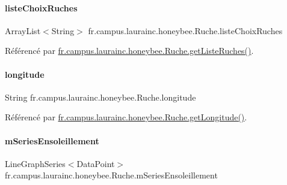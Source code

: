 \paragraph{\texorpdfstring{liste\+Choix\+Ruches}{listeChoixRuches}}
{\footnotesize\ttfamily Array\+List$<$String$>$ fr.\+campus.\+laurainc.\+honeybee.\+Ruche.\+liste\+Choix\+Ruches\hspace{0.3cm}{\ttfamily [private]}}



Référencé par \hyperlink{classfr_1_1campus_1_1laurainc_1_1honeybee_1_1_ruche_a7108fb412c0628d3966aa8c76fd9e2b7}{fr.\+campus.\+laurainc.\+honeybee.\+Ruche.\+get\+Liste\+Ruches()}.

\mbox{\label{classfr_1_1campus_1_1laurainc_1_1honeybee_1_1_ruche_a298a62f192d8f018fa5f4bd5b3d8c157}} 
\paragraph{\texorpdfstring{longitude}{longitude}}
{\footnotesize\ttfamily String fr.\+campus.\+laurainc.\+honeybee.\+Ruche.\+longitude\hspace{0.3cm}{\ttfamily [private]}}



Référencé par \hyperlink{classfr_1_1campus_1_1laurainc_1_1honeybee_1_1_ruche_a45b3656e287e168f17fdd1b9ec5fbca1}{fr.\+campus.\+laurainc.\+honeybee.\+Ruche.\+get\+Longitude()}.

\mbox{\label{classfr_1_1campus_1_1laurainc_1_1honeybee_1_1_ruche_a46b1a74ed27674490aff13504ce39b5a}} 
\paragraph{\texorpdfstring{m\+Series\+Ensoleillement}{mSeriesEnsoleillement}}
{\footnotesize\ttfamily Line\+Graph\+Series$<$Data\+Point$>$ fr.\+campus.\+laurainc.\+honeybee.\+Ruche.\+m\+Series\+Ensoleillement\hspace{0.3cm}{\ttfamily [private]}}



